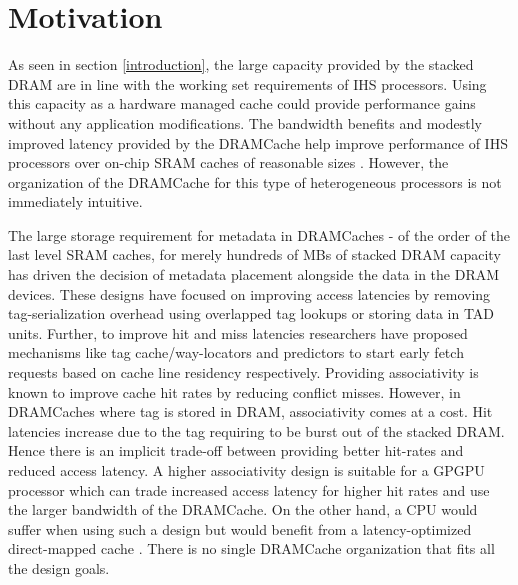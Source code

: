 \section{Motivation} \label{motivation}
As seen in section \ref{introduction}, the large capacity provided by the stacked DRAM are in line with the working set requirements of IHS processors. Using this capacity as a hardware managed cache could provide performance gains without any application modifications. The bandwidth benefits and modestly improved latency provided by the DRAMCache help improve performance of IHS processors over on-chip SRAM caches of reasonable sizes \cite{amd-exascale1}. However, the organization of the DRAMCache for this type of heterogeneous processors is not immediately intuitive.
\par The large storage requirement for metadata in DRAMCaches - of the order of the last level SRAM caches, for merely hundreds of MBs of stacked DRAM capacity has driven the decision of metadata placement alongside the data in the DRAM devices. These designs have focused on improving access latencies by removing tag-serialization overhead using overlapped tag lookups or storing data in TAD units. Further, to improve hit and miss latencies researchers have proposed mechanisms like tag cache/way-locators \cite{bimodal,atcache} and predictors to start early fetch requests based on cache line residency respectively. Providing associativity is known to improve cache hit rates by reducing conflict misses. However, in DRAMCaches where tag is stored in DRAM,  associativity comes at a cost. Hit latencies increase due to the tag requiring to be burst out of the stacked DRAM. Hence there is an implicit trade-off between providing better hit-rates and reduced access latency. A higher associativity design is suitable for a GPGPU processor which can trade increased access latency for higher hit rates and use the larger bandwidth of the DRAMCache. On the other hand, a CPU would suffer when using such a design but would benefit from a latency-optimized direct-mapped cache \cite{alloy}. There is no single DRAMCache organization that fits all the design goals. 

